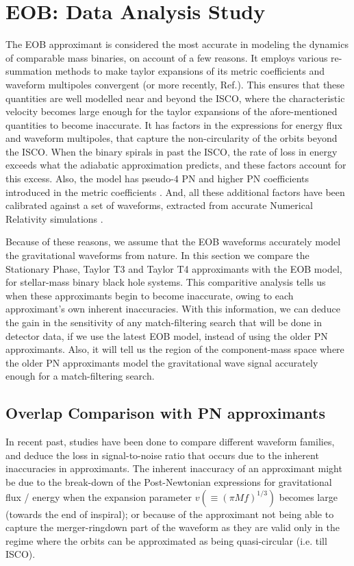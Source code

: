 \documentclass[aps,
prd,
amsmath,
amssymb,
twocolumn,
floatfix,
groupedaddress]{revtex4-1}
\def\l({\left(}
\def\r){\right)}
\begin{document}
\section{EOB: Data Analysis Study}\label{sec:level1:EOBDA}
The EOB approximant is considered the most accurate in modeling the dynamics of comparable mass binaries, on account of a few reasons. It employs various re-summation methods to make taylor expansions of its metric coefficients and waveform multipoles convergent \citep{PadeAD,ChebyshevResum2006} (or more recently, Ref.\citep{PadeSubDiag2011}). This ensures that these quantities are well modelled near and beyond the ISCO, where the characteristic velocity becomes large enough for the taylor expansions of the afore-mentioned quantities to become inaccurate. It has factors in the expressions for energy flux and waveform multipoles, that capture the non-circularity of the orbits beyond the ISCO. When the binary spirals in past the ISCO, the rate of loss in energy exceeds what the adiabatic approximation predicts, and these factors account for this excess. Also, the model has pseudo-4 PN and higher PN coefficients introduced in the metric coefficients \citep{BuonannoEOBv2Main}. And, all these additional factors have been calibrated against a set of waveforms, extracted from accurate Numerical Relativity simulations \citep{EOBNR01,EOBNRdevel01,EOBNRdevel02,EOBNRdevel03}.

Because of these reasons, we assume that the EOB waveforms accurately model the gravitational waveforms from nature. In this section we compare the Stationary Phase, Taylor T3 and Taylor T4 approximants with the EOB model, for stellar-mass binary black hole systems. This comparitive analysis tells us when these approximants begin to become inaccurate, owing to each approximant's own inherent inaccuracies. With this information, we can deduce the gain in the sensitivity of any match-filtering search that will be done in detector data, if we use the latest EOB model, instead of using the older PN approximants. Also, it will tell us the region of the component-mass space where the older PN approximants model the gravitational wave signal accurately enough for a match-filtering search.

\subsection{Overlap Comparison with PN approximants}\label{sec:level2:PNComparison}

In recent past, studies\citep{CompTemplates2001,CompTemplates2009,DamourF2EOB01,NRPNComparisonBaker2007,NRPNComparisonBoyleetal} have been done to compare different waveform families, and deduce the loss in signal-to-noise ratio that occurs due to the inherent inaccuracies in approximants. The inherent inaccuracy of an approximant might be due to the break-down of the Post-Newtonian expressions for gravitational flux / energy when the expansion parameter $v\l(\equiv (\pi Mf)^{1/3}\r)$ becomes large (towards the end of inspiral); or because of the approximant not being able to capture the merger-ringdown part of the waveform as they are valid only in the regime where the orbits can be approximated as being quasi-circular (i.e. till ISCO).
\end{document}
